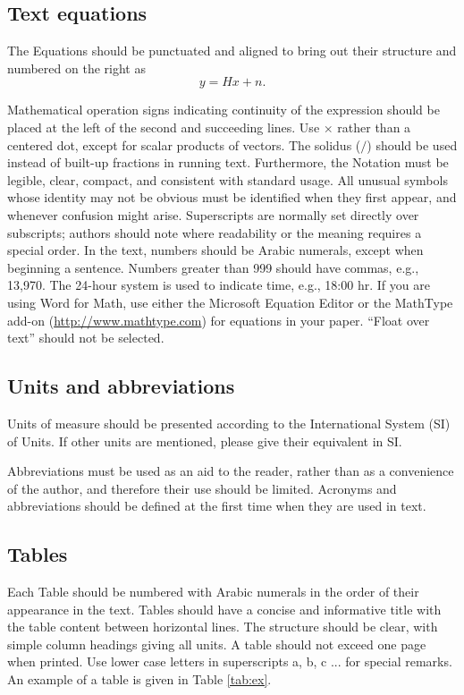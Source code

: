 \documentclass[final,3p,times,twocolumn]{elsarticle}
\begin{document}
\subsection{Text equations}

The Equations should be punctuated and aligned to bring out their structure and numbered on the right as
\begin{equation}
y = Hx+n.
\end{equation}

Mathematical operation signs indicating continuity of the expression should be placed at the left of the second and succeeding lines. 
Use $\times$ rather than a centered dot, except for scalar products of vectors. 
The solidus ($\slash$) should be used instead of built-up fractions in running text. 
Furthermore, the Notation must be legible, clear, compact, and consistent with standard usage. 
All unusual symbols whose identity may not be obvious must be identified when they first appear, and whenever confusion might arise. 
Superscripts are normally set directly over subscripts; authors should note where readability or the meaning requires a special order. 
In the text, numbers should be Arabic numerals, except when beginning a sentence. 
Numbers greater than 999 should have commas, e.g., 13,970. 
The 24-hour system is used to indicate time, e.g., 18:00 hr. 
If you are using Word for Math, use either the Microsoft Equation Editor or the MathType add-on (\url{http://www.mathtype.com}) for equations in your paper.
“Float over text” should not be selected.

\subsection{Units and abbreviations}
Units of measure should be presented according to the International System (SI) of Units. If other units are mentioned, please give their equivalent in SI.

Abbreviations must be used as an aid to the reader, rather than as a convenience of the author, and therefore their use should be limited. 
Acronyms and abbreviations should be defined at the first time when they are used in text.

\subsection{Tables}
Each Table should be numbered with Arabic numerals in the order of their appearance in the text. 
Tables should have a concise and informative title with the table content between horizontal lines. 
The structure should be clear, with simple column headings giving all units. 
A table should not exceed one page when printed. Use lower case letters in superscripts a, b, c ... for special remarks. 
An example of a table is given in Table \ref{tab:ex}.
\end{document}
